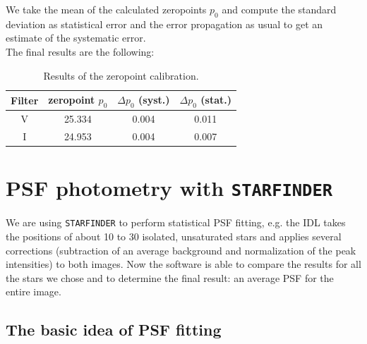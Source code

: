 We take the mean of the calculated zeropoints $p_0$ and compute the standard deviation as statistical error  and the error propagation as usual to get an estimate of the systematic error. \\
The final results are the following:

\begin{table}[H]
\setlength{\tabcolsep}{5mm}
\setlength\extrarowheight{2mm}
\centering
\begin{tabular}{c| c c c}

Filter  & zeropoint $p_0$ & $\Delta p_0$ (syst.) & $\Delta p_0$ (stat.) \\ \hline 

V & 25.334 & 0.004 & 0.011 \\
I & 24.953 & 0.004 & 0.007 \\

\end{tabular}
\caption{Results of the zeropoint calibration.}
\end{table}

\section{PSF photometry with \texttt{STARFINDER}}
We are using \texttt{STARFINDER} to perform statistical PSF fitting, e.g. the IDL takes the positions of about 10 to 30 isolated, unsaturated stars and applies several corrections (subtraction of an average background and normalization of the peak intensities) to both images. Now the software is able to compare the results for all the stars we chose and to determine the final result: an average PSF for the entire image.
\subsection*{The basic idea of PSF fitting}

